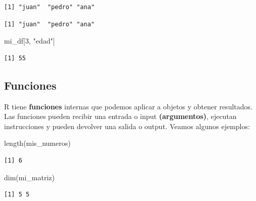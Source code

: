 \documentclass[
  letterpaper,
  DIV=11,
  numbers=noendperiod]{scrartcl}
\newenvironment{Shaded}{\begin{snugshade}}{\end{snugshade}}
\newcommand{\DecValTok}[1]{\textcolor[rgb]{0.68,0.00,0.00}{#1}}
\newcommand{\FunctionTok}[1]{\textcolor[rgb]{0.28,0.35,0.67}{#1}}
\newcommand{\NormalTok}[1]{\textcolor[rgb]{0.00,0.23,0.31}{#1}}
\newcommand{\SpecialCharTok}[1]{\textcolor[rgb]{0.37,0.37,0.37}{#1}}
\newcommand{\StringTok}[1]{\textcolor[rgb]{0.13,0.47,0.30}{#1}}
\begin{document}
\begin{verbatim}
[1] "juan"  "pedro" "ana"  
\end{verbatim}

\begin{Shaded}
\end{Shaded}

\begin{verbatim}
[1] "juan"  "pedro" "ana"  
\end{verbatim}

\begin{Shaded}
\begin{Highlighting}[]
\NormalTok{mi\_df[}\DecValTok{3}\NormalTok{, }\StringTok{"edad"}\NormalTok{]}
\end{Highlighting}
\end{Shaded}

\begin{verbatim}
[1] 55
\end{verbatim}

\subsection{Funciones}\label{funciones}

R tiene \textbf{funciones} internas que podemos aplicar a objetos y
obtener resultados. Las funciones pueden recibir una entrada o input
\textbf{(argumentos)}, ejecutan instrucciones y pueden devolver una
salida o output. Veamos algunos ejemplos:

\begin{Shaded}
\begin{Highlighting}[]
\FunctionTok{length}\NormalTok{(mis\_numeros) }
\end{Highlighting}
\end{Shaded}

\begin{verbatim}
[1] 6
\end{verbatim}

\begin{Shaded}
\begin{Highlighting}[]
\FunctionTok{dim}\NormalTok{(mi\_matriz) }
\end{Highlighting}
\end{Shaded}

\begin{verbatim}
[1] 5 5
\end{verbatim}
\end{document}

